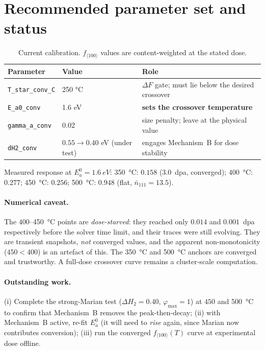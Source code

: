 \documentclass[11pt,a4paper]{article}
\newcommand{\fhkl}{f_{\langle100\rangle}}
\begin{document}
\section{Recommended parameter set and status}

\begin{table}[h]
\centering
\caption{Current calibration. $\fhkl$ values are content-weighted at the stated
dose.}
\begin{tabular}{lll}
\toprule
Parameter & Value & Role \\
\midrule
\texttt{T\_star\_conv\_C} & 250 \si{\celsius} & $\Delta F$ gate; must lie below the
   desired crossover \\
\texttt{E\_a0\_conv}      & 1.6 eV  & \textbf{sets the crossover temperature} \\
\texttt{gamma\_a\_conv}   & 0.02    & size penalty; leave at the physical value \\
\texttt{dH2\_conv}        & $0.55\to0.40$ eV (under test) & engages Mechanism~B for dose stability \\
\bottomrule
\end{tabular}
\end{table}

\noindent
Measured response at $E_a^0=\SI{1.6}{eV}$:
\SI{350}{\celsius}: $0.158$ (3.0~dpa, converged);
\SI{400}{\celsius}: $0.277$;
\SI{450}{\celsius}: $0.256$;
\SI{500}{\celsius}: $0.948$ (flat, $\bar n_{111}=13.5$).

\paragraph{Numerical caveat.}\label{sec:caveat} The $400$--\SI{450}{\celsius} points are
\emph{dose-starved}: they reached only $0.014$ and $0.001$~dpa respectively
before the solver time limit, and their traces were still evolving. They are
transient snapshots, \emph{not} converged values, and the apparent
non-monotonicity ($450<400$) is an artefact of this. The \SI{350}{\celsius} and
\SI{500}{\celsius} anchors are converged and trustworthy. A full-dose crossover
curve remains a cluster-scale computation.

\paragraph{Outstanding work.}
(i) Complete the strong-Marian test ($\Delta H_2=0.40$, $\varphi_{\max}=1$) at
$450$ and \SI{500}{\celsius} to confirm that Mechanism~B removes the
peak-then-decay;
(ii) with Mechanism~B active, re-fit $E_a^0$ (it will need to \emph{rise} again,
since Marian now contributes conversion);
(iii) run the converged $\fhkl(T)$ curve at experimental dose offline.
\end{document}
